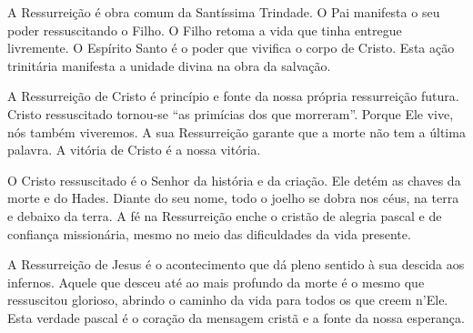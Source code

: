 A Ressurreição é obra comum da Santíssima Trindade. O Pai manifesta o seu poder ressuscitando o Filho. O Filho retoma a vida que tinha entregue livremente. O Espírito Santo é o poder que vivifica o corpo de Cristo. Esta ação trinitária manifesta a unidade divina na obra da salvação.

A Ressurreição de Cristo é princípio e fonte da nossa própria ressurreição futura. Cristo ressuscitado tornou-se ``as primícias dos que morreram''. Porque Ele vive, nós também viveremos. A sua Ressurreição garante que a morte não tem a última palavra. A vitória de Cristo é a nossa vitória.

O Cristo ressuscitado é o Senhor da história e da criação. Ele detém as chaves da morte e do Hades. Diante do seu nome, todo o joelho se dobra nos céus, na terra e debaixo da terra. A fé na Ressurreição enche o cristão de alegria pascal e de confiança missionária, mesmo no meio das dificuldades da vida presente.

A Ressurreição de Jesus é o acontecimento que dá pleno sentido à sua descida aos infernos. Aquele que desceu até ao mais profundo da morte é o mesmo que ressuscitou glorioso, abrindo o caminho da vida para todos os que creem n'Ele. Esta verdade pascal é o coração da mensagem cristã e a fonte da nossa esperança.
